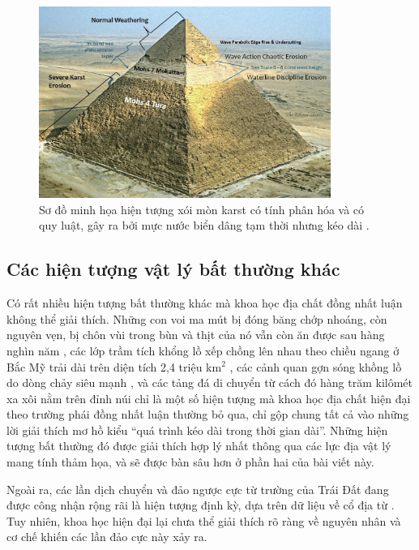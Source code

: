 \documentclass[10pt,twocolumn,letterpaper]{article}
\begin{document}
\begin{figure}[t]
\begin{center}
\includegraphics[width=0.85\textwidth]{khafre.jpg}
\end{center}
   \caption{Sơ đồ minh họa hiện tượng xói mòn karst có tính phân hóa và có quy luật, gây ra bởi mực nước biển dâng tạm thời nhưng kéo dài \cite{27}.}
\label{fig:4}
\end{figure}
\subsection{Các hiện tượng vật lý bất thường khác}

Có rất nhiều hiện tượng bất thường khác mà khoa học địa chất đồng nhất luận không thể giải thích. Những con voi ma mút bị đóng băng chớp nhoáng, còn nguyên vẹn, bị chôn vùi trong bùn và thịt của nó vẫn còn ăn được sau hàng nghìn năm \cite{17,18,19}, các lớp trầm tích khổng lồ xếp chồng lên nhau theo chiều ngang ở Bắc Mỹ trải dài trên diện tích 2,4 triệu km$^2$ \cite{21}, các cảnh quan gợn sóng khồng lồ do dòng chảy siêu mạnh \cite{22}, và các tảng đá di chuyển từ cách đó hàng trăm kilômét xa xôi nằm trên đỉnh núi \cite{23,26} chỉ là một số hiện tượng mà khoa học địa chất hiện đại theo trường phái đồng nhất luận thường bỏ qua, chỉ gộp chung tất cả vào những lời giải thích mơ hồ kiểu “quá trình kéo dài trong thời gian dài”. Những hiện tượng bất thường đó được giải thích hợp lý nhất thông qua các lực địa vật lý mang tính thảm họa, và sẽ được bàn sâu hơn ở phần hai của bài viết này.

Ngoài ra, các lần dịch chuyển và đảo ngược cực từ trường của Trái Đất đang được công nhận rộng rãi là hiện tượng định kỳ, dựa trên dữ liệu về cổ địa từ \cite{35,40,41}. Tuy nhiên, khoa học hiện đại lại chưa thể giải thích rõ ràng về nguyên nhân và cơ chế khiến các lần đảo cực này xảy ra.
\end{document}
